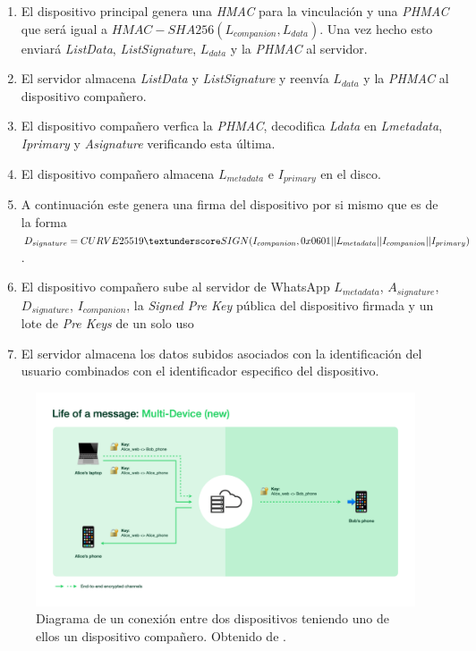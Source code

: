 \begin{description}
\begin{enumerate}
		\item El dispositivo principal genera una \emph{HMAC} para la vinculación y una \emph{PHMAC} que será igual a $HMAC-SHA256(L_{companion}, L_{data})$. Una vez hecho esto enviará \emph{ListData}, \emph{ListSignature}, $L_{data}$ y la \emph{PHMAC} al servidor.
		\item El servidor almacena \emph{ListData} y \emph{ListSignature} y reenvía $L_{data}$ y la \emph{PHMAC} al dispositivo compañero.
		\item El dispositivo compañero  verfica la \emph{PHMAC}, decodifica \emph{Ldata} en \emph{Lmetadata}, \emph{Iprimary} y \emph{Asignature} verificando esta última.
		\item El dispositivo compañero almacena $L_{metadata}$ e $I_{primary}$ en el disco.
		\item A continuación este genera una firma del dispositivo por si mismo que es de la forma $D_{signature}=CURVE25519\textunderscore SIGN(I_{companion}, 0x0601\\ || L_{metadata} || I_{companion} || I_{primary})$.
		\item El dispositivo compañero sube al servidor de WhatsApp $L_{metadata}$, $A_{signature}$, $D_{signature}$, $I_{companion}$, la \emph{Signed Pre Key} pública del dispositivo firmada y un lote de \emph{Pre Keys} de un solo uso
		\item El servidor almacena los datos subidos asociados con la identificación del usuario combinados con el identificador especifico del dispositivo.
	\end{enumerate}
\end{description}


\begin{figure}[htb]
	\centering
	\includegraphics[scale=0.25]{imagenes/what1.png} 
	\caption{Diagrama de un conexión entre dos dispositivos teniendo uno de ellos un dispositivo compañero. Obtenido de \cite{what1}.}
	\label{what1}
\end{figure}

